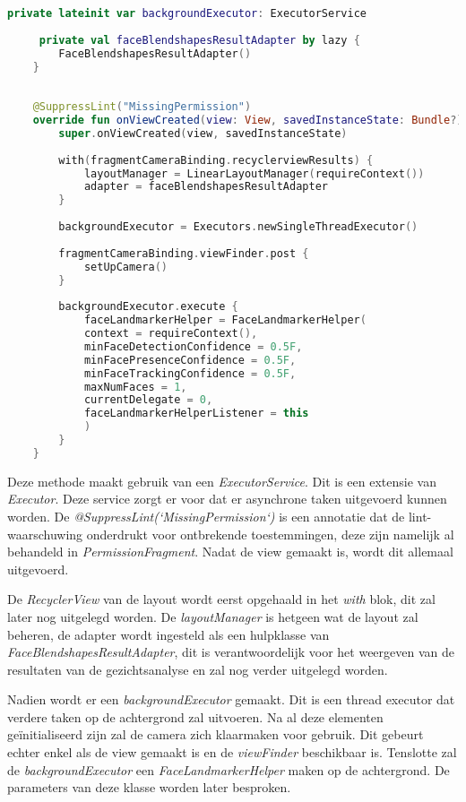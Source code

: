 \begin{lstlisting}[language=Kotlin, caption=onViewCreated in CameraFragment.kt, label={lst:onViewCreatedCameraFragment}]
    private lateinit var backgroundExecutor: ExecutorService
    
     private val faceBlendshapesResultAdapter by lazy {
        FaceBlendshapesResultAdapter()
    }
    
    
    @SuppressLint("MissingPermission")
    override fun onViewCreated(view: View, savedInstanceState: Bundle?) {
        super.onViewCreated(view, savedInstanceState)
        
        with(fragmentCameraBinding.recyclerviewResults) {
            layoutManager = LinearLayoutManager(requireContext())
            adapter = faceBlendshapesResultAdapter
        }
        
        backgroundExecutor = Executors.newSingleThreadExecutor()
        
        fragmentCameraBinding.viewFinder.post {
            setUpCamera()
        }
        
        backgroundExecutor.execute {
            faceLandmarkerHelper = FaceLandmarkerHelper(
            context = requireContext(),
            minFaceDetectionConfidence = 0.5F,
            minFacePresenceConfidence = 0.5F,
            minFaceTrackingConfidence = 0.5F,
            maxNumFaces = 1,
            currentDelegate = 0,
            faceLandmarkerHelperListener = this
            )
        }
    }
\end{lstlisting}
Deze methode maakt gebruik van een \emph{ExecutorService}. Dit is een extensie van \emph{Executor}. Deze service zorgt er voor dat er asynchrone taken uitgevoerd kunnen worden. De \emph{@SuppressLint(`MissingPermission`)} is een annotatie dat de lint-waarschuwing onderdrukt voor ontbrekende toestemmingen, deze zijn namelijk al behandeld in \emph{PermissionFragment}. Nadat de view gemaakt is, wordt dit allemaal uitgevoerd.

De \emph{RecyclerView} van de layout wordt eerst opgehaald in het \emph{with} blok, dit zal later nog uitgelegd worden. De \emph{layoutManager} is hetgeen wat de layout zal beheren, de adapter wordt ingesteld als een hulpklasse van \emph{FaceBlendshapesResultAdapter}, dit is verantwoordelijk voor het weergeven van de resultaten van de gezichtsanalyse en zal nog verder uitgelegd worden.

Nadien wordt er een \emph{backgroundExecutor} gemaakt. Dit is een thread executor dat verdere taken op de achtergrond zal uitvoeren. Na al deze elementen geïnitialiseerd zijn zal de camera zich klaarmaken voor gebruik. Dit gebeurt echter enkel als de view gemaakt is en de \emph{viewFinder} beschikbaar is. Tenslotte zal de \emph{backgroundExecutor} een \emph{FaceLandmarkerHelper} maken op de achtergrond. De parameters van deze klasse worden later besproken.

